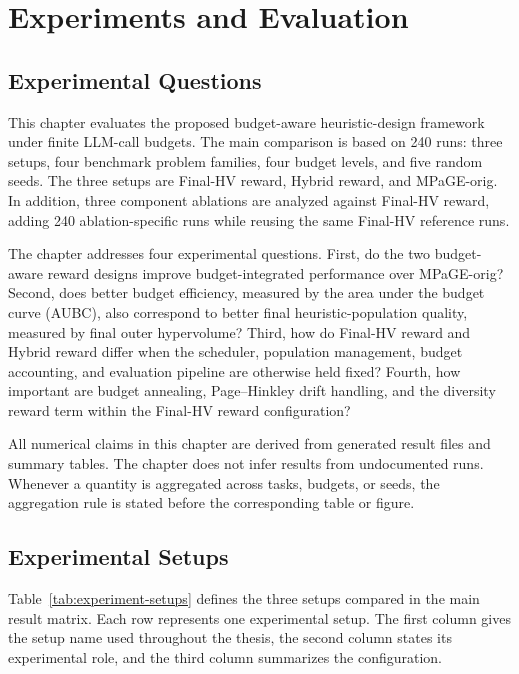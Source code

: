 \chapter{Experiments and Evaluation}

\section{Experimental Questions}

This chapter evaluates the proposed budget-aware heuristic-design framework under finite LLM-call budgets. The main comparison is based on 240 runs: three setups, four benchmark problem families, four budget levels, and five random seeds. The three setups are Final-HV reward, Hybrid reward, and MPaGE-orig. In addition, three component ablations are analyzed against Final-HV reward, adding 240 ablation-specific runs while reusing the same Final-HV reference runs.

The chapter addresses four experimental questions. First, do the two budget-aware reward designs improve budget-integrated performance over MPaGE-orig? Second, does better budget efficiency, measured by the area under the budget curve (AUBC), also correspond to better final heuristic-population quality, measured by final outer hypervolume? Third, how do Final-HV reward and Hybrid reward differ when the scheduler, population management, budget accounting, and evaluation pipeline are otherwise held fixed? Fourth, how important are budget annealing, Page--Hinkley drift handling, and the diversity reward term within the Final-HV reward configuration?

All numerical claims in this chapter are derived from generated result files and summary tables. The chapter does not infer results from undocumented runs. Whenever a quantity is aggregated across tasks, budgets, or seeds, the aggregation rule is stated before the corresponding table or figure.

\section{Experimental Setups}

Table~\ref{tab:experiment-setups} defines the three setups compared in the main result matrix. Each row represents one experimental setup. The first column gives the setup name used throughout the thesis, the second column states its experimental role, and the third column summarizes the configuration.



